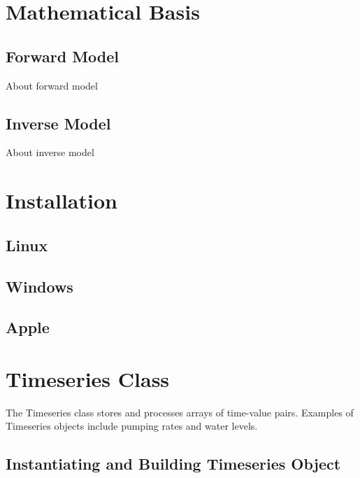 \documentclass[10pt,twoside,openright]{memoir}
\begin{document}
\chapter{Mathematical Basis}

\section{Forward Model}
About forward model

\section{Inverse Model}
About inverse model



\chapter{Installation}

\section{Linux}
\section{Windows}
\section{Apple}


\chapter{Timeseries Class}

The Timeseries class stores and processes arrays of time-value pairs. Examples of
Timeseries objects include pumping rates and water levels.

\section{Instantiating and Building Timeseries Object}
\end{document}
